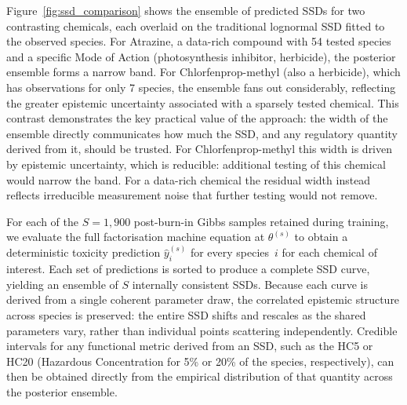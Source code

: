 Figure~\ref{fig:ssd_comparison} shows the ensemble of predicted SSDs for two contrasting chemicals, each overlaid on the traditional lognormal SSD fitted to the observed species. For Atrazine, a data-rich compound with 54 tested species and a specific Mode of Action (photosynthesis inhibitor, herbicide), the posterior ensemble forms a narrow band. For Chlorfenprop-methyl (also a herbicide), which has observations for only 7 species, the ensemble fans out considerably, reflecting the greater epistemic uncertainty associated with a sparsely tested chemical. This contrast demonstrates the key practical value of the approach: the width of the ensemble directly communicates how much the SSD, and any regulatory quantity derived from it, should be trusted. For Chlorfenprop-methyl this width is driven by epistemic uncertainty, which is reducible: additional testing of this chemical would narrow the band. For a data-rich chemical the residual width instead reflects irreducible measurement noise that further testing would not remove.


For each of the $S = 1{,}900$ post-burn-in Gibbs samples retained during training, we evaluate the full factorisation machine equation at $\theta^{(s)}$ to obtain a deterministic toxicity prediction $\hat{y}_i^{(s)}$ for every species~$i$ for each chemical of interest. Each set of predictions is sorted to produce a complete SSD curve, yielding an ensemble of $S$ internally consistent SSDs. Because each curve is derived from a single coherent parameter draw, the correlated epistemic structure across species is preserved: the entire SSD shifts and rescales as the shared parameters vary, rather than individual points scattering independently. Credible intervals for any functional metric derived from an SSD, such as the HC5 or HC20 (Hazardous Concentration for 5\% or 20\% of the species, respectively), can then be obtained directly from the empirical distribution of that quantity across the posterior ensemble.

